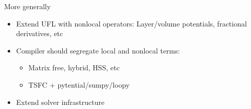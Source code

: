 \documentclass{beamer}
\begin{document}
\begin{frame}{More generally}
  \begin{itemize}
  \item<2-> Extend UFL with nonlocal operators: Layer/volume potentials, fractional derivatives, etc
  \item<3-> Compiler should segregate local and nonlocal terms:
    \begin{itemize}
    \item<4-> Matrix free, hybrid, HSS, etc
    \item<5-> TSFC + pytential/sumpy/loopy
    \end{itemize}
  \item<6-> Extend solver infrastructure
  \end{itemize}
\end{frame}
\end{document}
